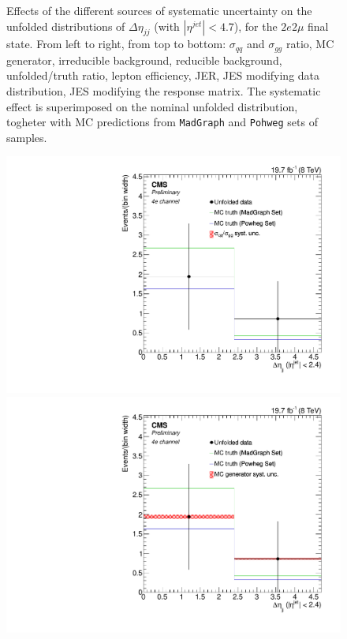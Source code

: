 \begin{figure}[hbtp]
\begin{center}
   \caption{Effects of the different sources of systematic uncertainty on the unfolded distributions of $\Delta\eta_{jj}$ (with $|\eta^{jet}|<4.7$), for the $2e2\mu$ final state. From left to right, from top to bottom: $\sigma_{qq}$ and $\sigma_{gg}$ ratio, MC generator, irreducible background, reducible background, unfolded/truth ratio, lepton efficiency, JER, JES modifying data distribution, JES modifying the response matrix. The systematic effect is superimposed on the nominal unfolded distribution, togheter with MC predictions from \texttt{MadGraph} and \texttt{Pohweg} sets of samples.}
   \label{fig:Detasyst2e2m}
 \end{center}
\end{figure}
\clearpage
\begin{figure}[hbtp]
 \begin{center}
   \includegraphics[width=0.8\cmsFigWidth]{Figures/Unfolding/Systematics/ZZTo4e_CentralDeta_qqgg_Mad_fr}     
   \includegraphics[width=0.8\cmsFigWidth]{Figures/Unfolding/Systematics/ZZTo4e_CentralDeta_MCgen_Mad_fr}     

\end{center}
\end{figure}
